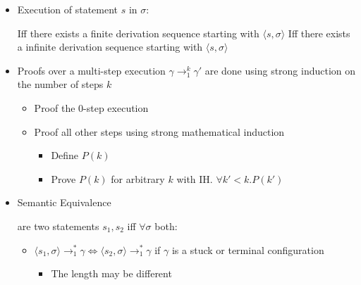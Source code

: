 \begin{itemize}
\begin{itemize}
\begin{itemize}
\begin{itemize}
                        \end{itemize}
                \end{itemize}
                \begin{itemize}
                    \item Execution of statement $s$ in $\sigma$:
                        \begin{itemize}
                             Iff there exists a finite derivation sequence starting with $\langle s, \sigma \rangle$
                             Iff there exists a infinite derivation sequence starting with $\langle s, \sigma \rangle$
                        \end{itemize}
                \end{itemize}
        \end{itemize}
        \begin{itemize}
            \item Proofs over a multi-step execution $\gamma \to_1^k \gamma'$ are done using strong induction on the number of steps $k$
                \begin{itemize}
                    \item Proof the $0$-step execution
                    \item Proof all other steps using strong mathematical induction
                        \begin{itemize}
                            \item Define $P(k)$
                            \item Prove $P(k)$ for arbitrary $k$ with IH. $\forall k' < k. P(k')$
                        \end{itemize}
                \end{itemize}
            \item Semantic Equivalence
                \begin{itemize}
                     are two statements $s_1, s_2$ iff $\forall \sigma$ both:
                        \begin{itemize}
                            \item $\langle s_1, \sigma \rangle \to_1^* \gamma \iff \langle s_2, \sigma \rangle \to_1^* \gamma$ if $\gamma$ is a stuck or terminal configuration
                                \begin{itemize}
                                    \item The length may be different

\end{itemize}
\end{itemize}
\end{itemize}
\end{itemize}
\end{itemize}
